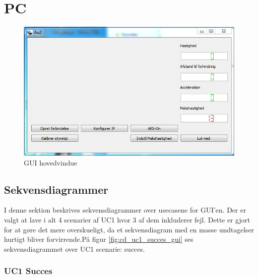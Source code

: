 \clearpage
\section{PC} \label{sec:PC}

\begin{figure}[H]
\centering
\includegraphics[width=\textwidth* 3/4,height=\textwidth* 9/20 ]{../fig/billeder/gui_start.png}
\caption{GUI hovedvindue}
\label{fig:GUI_hovedvindue}
\end{figure}

\subsection{Sekvensdiagrammer}

I denne sektion beskrives sekvensdiagrammer over usecasene for GUI'en. Der er valgt at lave i alt 4 scenarier af UC1 hvor 3 af dem inkluderer fejl. Dette er gjort for at gøre det mere overskueligt, da et sekvensdiagram med en masse undtagelser hurtigt bliver forvirrende.På figur
\ref{fig:cd_uc1_succes_gui} ses sekvensdiagrammet over UC1 scenarie: succes.

\subsubsection{UC1 Succes}

